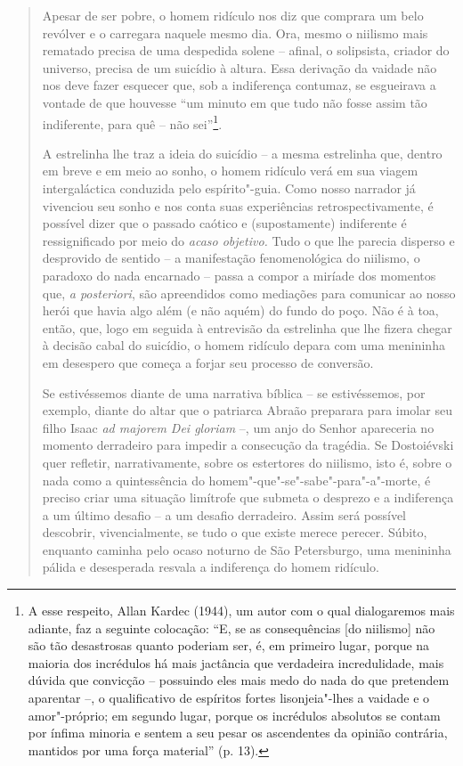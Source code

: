 {\begin{quote}
Apesar de ser pobre, o homem ridículo nos diz que comprara um belo
revólver e o carregara naquele mesmo dia. Ora, mesmo o niilismo mais
rematado precisa de uma despedida solene -- afinal, o solipsista,
criador do universo, precisa de um suicídio à altura. Essa derivação da
vaidade não nos deve fazer esquecer que, sob a indiferença contumaz, se
esgueirava a vontade de que houvesse ``um minuto em que tudo não fosse
assim tão indiferente, para quê -- não sei''\footnote{A esse respeito,
  Allan Kardec (1944), um autor com o qual dialogaremos mais adiante,
  faz a seguinte colocação: ``E, se as consequências {[}do niilismo{]}
  não são tão desastrosas quanto poderiam ser, é, em primeiro lugar,
  porque na maioria dos incrédulos há mais jactância que verdadeira
  incredulidade, mais dúvida que convicção -- possuindo eles mais medo
  do nada do que pretendem aparentar --, o qualificativo de espíritos
  fortes lisonjeia"-lhes a vaidade e o amor"-próprio; em segundo lugar,
  porque os incrédulos absolutos se contam por ínfima minoria e sentem a
  seu pesar os ascendentes da opinião contrária, mantidos por uma força
  material'' (p. 13).}.

A estrelinha lhe traz a ideia do suicídio -- a mesma estrelinha que,
dentro em breve e em meio ao sonho, o homem ridículo verá em sua viagem
intergaláctica conduzida pelo espírito"-guia. Como nosso narrador já
vivenciou seu sonho e nos conta suas experiências retrospectivamente, é
possível dizer que o passado caótico e (supostamente) indiferente é
ressignificado por meio do \emph{acaso objetivo.} Tudo o que lhe parecia
disperso e desprovido de sentido -- a manifestação fenomenológica do
niilismo, o paradoxo do nada encarnado -- passa a compor a miríade dos
momentos que, \emph{a posteriori}, são apreendidos como mediações para
comunicar ao nosso herói que havia algo além (e não aquém) do fundo do
poço. Não é à toa, então, que, logo em seguida à entrevisão da
estrelinha que lhe fizera chegar à decisão cabal do suicídio, o homem
ridículo depara com uma menininha em desespero que começa a forjar seu
processo de conversão.

Se estivéssemos diante de uma narrativa bíblica -- se estivéssemos, por
exemplo, diante do altar que o patriarca Abraão preparara para imolar
seu filho Isaac \emph{ad majorem Dei gloriam} --, um anjo do Senhor
apareceria no momento derradeiro para impedir a consecução da tragédia.
Se Dostoiévski quer refletir, narrativamente, sobre os estertores do
niilismo, isto é, sobre o nada como a quintessência do
homem"-que"-se"-sabe"-para"-a"-morte, é preciso criar uma situação limítrofe
que submeta o desprezo e a indiferença a um último desafio -- a um
desafio derradeiro. Assim será possível descobrir, vivencialmente, se
tudo o que existe merece perecer. Súbito, enquanto caminha pelo ocaso
noturno de São Petersburgo, uma menininha pálida e desesperada resvala a
indiferença do homem ridículo.


\end{quote}}
